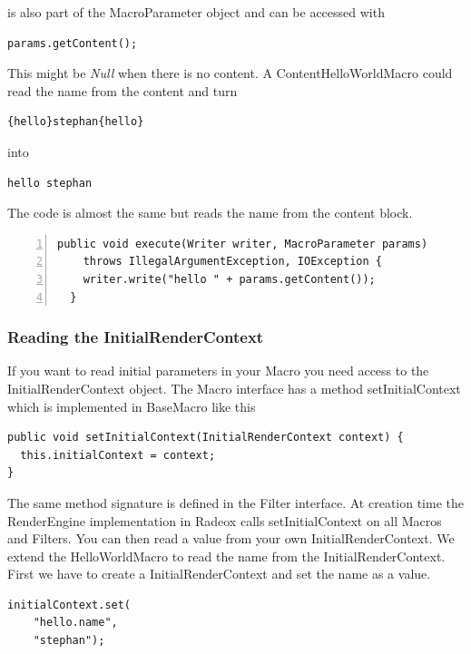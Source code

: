 \documentclass[a4paper,pdftex]{article}
\begin{document}
is also part of the MacroParameter object and can be accessed with

\begin{verbatim}
params.getContent();
\end{verbatim}

This might be {\it Null} when there is no content. A ContentHelloWorldMacro could
read the name from the content and turn

\begin{verbatim}
{hello}stephan{hello}
\end{verbatim}

into 

\begin{verbatim}
hello stephan
\end{verbatim}

The code is almost the same but reads the name from the content block.

\begin{Verbatim}[gobble=2,frame=single,numbers=left,fontsize=\small]
  public void execute(Writer writer, MacroParameter params)
    throws IllegalArgumentException, IOException {
    writer.write("hello " + params.getContent());
  }
\end{Verbatim}

\subsubsection{Reading the InitialRenderContext}

If you want to read initial parameters in your Macro you need access to the InitialRenderContext object. 
The Macro interface has a method setInitialContext which is implemented in BaseMacro like this

\begin{verbatim}
public void setInitialContext(InitialRenderContext context) {
  this.initialContext = context;
}
\end{verbatim}

The same method signature is defined in  the Filter interface. At creation time the RenderEngine implementation in Radeox calls setInitialContext on all
Macros and Filters. You can then read a value from your own InitialRenderContext. We extend the HelloWorldMacro to read the name
from the InitialRenderContext. First we have to create a InitialRenderContext and set the name as a value.

\begin{verbatim}
initialContext.set(
    "hello.name", 
    "stephan");
\end{verbatim}
\end{document}
